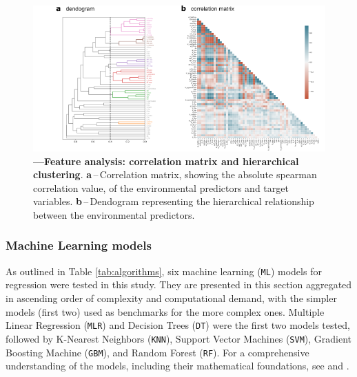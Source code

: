 \documentclass[12pt]{article}
\begin{document}
\FloatBarrier
\begin{figure}[htb] %
	\centering                                       
	\includegraphics[width=0.98\linewidth]{figs/03_cluster.png}    
	\caption[Features correlation and clusters]
	{\textbf{---\;Feature analysis: correlation matrix and hierarchical clustering}.
	\textbf{a}\,--\,Correlation matrix, showing the absolute spearman correlation value, of the environmental predictors and target variables. 
        \textbf{b}\,--\,Dendogram representing the hierarchical relationship between the environmental predictors.
	}
    \label{fig:corrmatrix}            
\end{figure}

\subsubsection{Machine Learning models} \label{sec:datagen:proceval:ml}

\par As outlined in Table \ref{tab:algorithms}, six machine learning (\texttt{ML}) models for regression were tested in this study. They are presented in this section aggregated in ascending order of complexity and computational demand, with the simpler models (first two) used as benchmarks for the more complex ones. Multiple Linear Regression (\texttt{MLR}) and Decision Trees (\texttt{DT}) were the first two models tested, followed by K-Nearest Neighbors (\texttt{KNN}), Support Vector Machines (\texttt{SVM}), Gradient Boosting Machine (\texttt{GBM}), and Random Forest (\texttt{RF}). For a comprehensive understanding of the models, including their mathematical foundations, see \cite{kuhn2013} and \cite{shalev2014}. 
\end{document}
